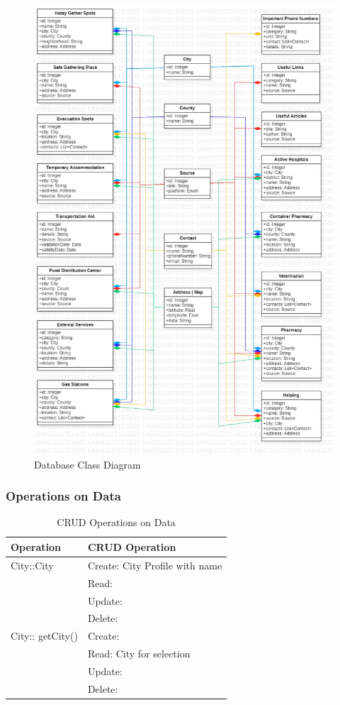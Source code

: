\begin{figure}[H]
  \centering
  \includegraphics[width=\linewidth]{img/database-class-diagram.jpg}
  \caption{Database Class Diagram}
\end{figure}

\subsubsection{Operations on Data}

\begin{table}[H]
  \centering
  \begin{tabular}{|l|l|}
    \hline
    Operation & CRUD Operation \\ \hline
    City::City & Create: City Profile with name \\
               & Read: \\
               & Update: \\
               & Delete: \\ \hline
    City:: getCity() & Create: \\
                     & Read: City for selection \\
                     & Update: \\
                     & Delete: \\ \hline
  \end{tabular}
  \caption{CRUD Operations on Data}
\end{table}

